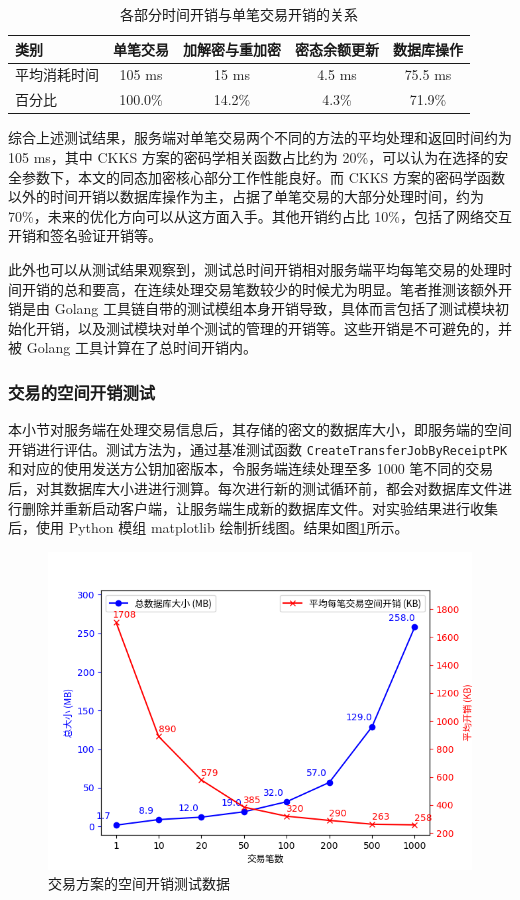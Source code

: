 \begin{table}[h]
    \begin{tabular}{|l|c|c|c|c|}
        \hline
        类别 & 单笔交易 & 加解密与重加密 & 密态余额更新 & 数据库操作 \\
        \hline
        平均消耗时间 & 105 ms & 15 ms & 4.5 ms & 75.5 ms \\ 
        \hline
        百分比 & 100.0\% & 14.2\% & 4.3\% & 71.9\% \\
        \hline
    \end{tabular}
    \caption{各部分时间开销与单笔交易开销的关系} \label{Tab:time_comsumption}
\end{table}

综合上述测试结果，服务端对单笔交易两个不同的方法的平均处理和返回时间约为 105 ms，其中 CKKS 方案的密码学相关函数占比约为 20\%，可以认为在选择的安全参数下，本文的同态加密核心部分工作性能良好。而 CKKS 方案的密码学函数以外的时间开销以数据库操作为主，占据了单笔交易的大部分处理时间，约为 70\%，未来的优化方向可以从这方面入手。其他开销约占比 10\%，包括了网络交互开销和签名验证开销等。

此外也可以从测试结果观察到，测试总时间开销相对服务端平均每笔交易的处理时间开销的总和要高，在连续处理交易笔数较少的时候尤为明显。笔者推测该额外开销是由 Golang 工具链自带的测试模组本身开销导致，具体而言包括了测试模块初始化开销，以及测试模块对单个测试的管理的开销等。这些开销是不可避免的，并被 Golang 工具计算在了总时间开销内。

\subsubsection{交易的空间开销测试}

本小节对服务端在处理交易信息后，其存储的密文的数据库大小，即服务端的空间开销进行评估。测试方法为，通过基准测试函数 \verb|CreateTransferJobByReceiptPK| 和对应的使用发送方公钥加密版本，令服务端连续处理至多 1000 笔不同的交易后，对其数据库大小进进行测算。每次进行新的测试循环前，都会对数据库文件进行删除并重新启动客户端，让服务端生成新的数据库文件。对实验结果进行收集后，使用 Python 模组 matplotlib 绘制折线图。结果如图\ref{Fig:graph_database_size}所示。

\begin{figure}[h]
    \centering
    \includegraphics[width=0.8\linewidth]{./Figures/matplots/Bench_DatabaseSize.png}
    \caption{交易方案的空间开销测试数据} \label{Fig:graph_database_size}
\end{figure}

